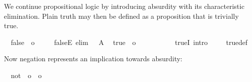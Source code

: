 \begin{isabellebody}
\begin{isamarkuptext}
  \medskip We continue propositional logic by introducing absurdity
  with its characteristic elimination.  Plain truth may then be
  defined as a proposition that is trivially true.%
\end{isamarkuptext}%
\isamarkuptrue%
\isamarkupfalse%
\isanewline
\ \ false\ {}{}\ o\ \ {}{}{}{}{}\ \isanewline
\ \ falseE\ {}elim{}{}\ {}{}\ {}\ A{}\isanewline
\isanewline
{}\isamarkupfalse%
\isanewline
\ \ true\ {}{}\ o\ \ {}{}{}{}{}\ \isanewline
\ \ {}{}\ {}\ {}\ {}\ {}{}\isanewline
\isanewline
{}\isamarkupfalse%
\ trueI\ {}intro{}{}\ {}\isanewline
%
\isadelimproof
\ \ %
\endisadelimproof
%
\isatagproof
{}\isamarkupfalse%
\ true{}def\ \isamarkupfalse%
%
\endisatagproof
{\isafoldproof}%
%
\isadelimproof
%
\endisadelimproof
%
\begin{isamarkuptext}%
\medskip\noindent Now negation represents an implication towards
  absurdity:%
\end{isamarkuptext}%
\isamarkuptrue%
\isamarkupfalse%
\isanewline
\ \ not\ {}{}\ {}o\ {}\ o{}\ \ {}{}{}\ {}{}\ {}{}{}{}\ {}{}{}\ \isanewline

\end{isabellebody}
